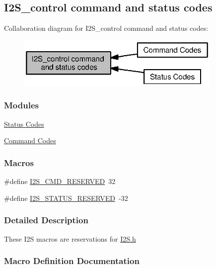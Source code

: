 \subsection{I2\+S\+\_\+control command and status codes}
\label{group___i2_s___c_o_n_t_r_o_l}
Collaboration diagram for I2\+S\+\_\+control command and status codes\+:
\nopagebreak
\begin{figure}[H]
\begin{center}
\leavevmode
\includegraphics[width=281pt]{group___i2_s___c_o_n_t_r_o_l}
\end{center}
\end{figure}
\subsubsection*{Modules}
\begin{DoxyCompactItemize}
\item 
\hyperlink{group___i2_s___s_t_a_t_u_s}{Status Codes}
\item 
\hyperlink{group___i2_s___c_m_d}{Command Codes}
\end{DoxyCompactItemize}
\subsubsection*{Macros}
\begin{DoxyCompactItemize}
\item 
\#define \hyperlink{group___i2_s___c_o_n_t_r_o_l_gaf919ac4341fca59988c28e16058fa819}{I2\+S\+\_\+\+C\+M\+D\+\_\+\+R\+E\+S\+E\+R\+V\+E\+D}~32
\item 
\#define \hyperlink{group___i2_s___c_o_n_t_r_o_l_ga3fad4fcf6773f3c5946c4881631f838d}{I2\+S\+\_\+\+S\+T\+A\+T\+U\+S\+\_\+\+R\+E\+S\+E\+R\+V\+E\+D}~-\/32
\end{DoxyCompactItemize}


\subsubsection{Detailed Description}
These I2\+S macros are reservations for \hyperlink{_i2_s_8h}{I2\+S.\+h} 

\subsubsection{Macro Definition Documentation}
